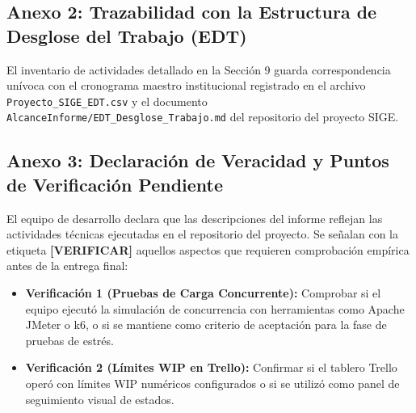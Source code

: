 \documentclass[12pt,a4paper]{article}
\begin{document}
\subsection*{Anexo 2: Trazabilidad con la Estructura de Desglose del Trabajo (EDT)}
El inventario de actividades detallado en la Sección 9 guarda correspondencia unívoca con el cronograma maestro institucional registrado en el archivo \texttt{Proyecto\_SIGE\_EDT.csv} y el documento \texttt{AlcanceInforme/EDT\_Desglose\_Trabajo.md} del repositorio del proyecto SIGE.

\subsection*{Anexo 3: Declaración de Veracidad y Puntos de Verificación Pendiente}
El equipo de desarrollo declara que las descripciones del informe reflejan las actividades técnicas ejecutadas en el repositorio del proyecto. Se señalan con la etiqueta \textbf{[VERIFICAR]} aquellos aspectos que requieren comprobación empírica antes de la entrega final:
\begin{itemize}[leftmargin=1.5em, itemsep=2pt]
    \item \textbf{Verificación 1 (Pruebas de Carga Concurrente):} Comprobar si el equipo ejecutó la simulación de concurrencia con herramientas como Apache JMeter o k6, o si se mantiene como criterio de aceptación para la fase de pruebas de estrés.
    \item \textbf{Verificación 2 (Límites WIP en Trello):} Confirmar si el tablero Trello operó con límites WIP numéricos configurados o si se utilizó como panel de seguimiento visual de estados.
\end{itemize}
\end{document}
